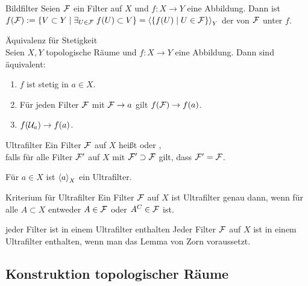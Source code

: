 \begin{Def}{Bildfilter}
    Seien $\mathcal{F}$ ein Filter auf $X$ und $f\colon X \rightarrow Y$ eine
    Abbildung.
    Dann ist \\
    $f(\mathcal{F}) := \{V \subset Y \;|\;
    \exists_{U \in \mathcal{F}}\; f(U) \subset V\} =
    \left\langle{\{f(U) \;|\; U \in \ensuremath{\mathcal{F}}\}}\right\rangle_Y$
    der  von $\mathcal{F}$ unter $f$.
\end{Def}

\begin{Satz}{Äquivalenz für Stetigkeit}\\
    Seien $X, Y$ topologische Räume und $f\colon X \rightarrow Y$ eine
    Abbildung.
    Dann sind äquivalent:
    \begin{enumerate}
        \item
        $f$ ist stetig in $a \in X$.

        \item
        Für jeden Filter $\mathcal{F}$ mit $\mathcal{F} \to a$ gilt $f(\mathcal{F}) \to f(a)$.

        \item
        $f(\mathcal{U}_a) \to f(a)$.
    \end{enumerate}
\end{Satz}

\linie

\begin{Def}{Ultrafilter}
    Ein Filter $\mathcal{F}$ auf $X$ heißt  oder
    , \\
    falls für alle Filter $\mathcal{F}'$ auf $X$ mit $\mathcal{F}' \supset \mathcal{F}$ gilt,
    dass $\mathcal{F}' = \mathcal{F}$.
\end{Def}

\begin{Bsp}
    Für $a \in X$ ist $\left\langle{a}\right\rangle_X$ ein Ultrafilter.
\end{Bsp}

\begin{Satz}{Kriterium für Ultrafilter}
    Ein Filter $\mathcal{F}$ auf $X$ ist Ultrafilter genau dann, wenn für alle
    $A \subset X$ entweder $A \in \mathcal{F}$ oder $A^C \in \mathcal{F}$ ist.
\end{Satz}

\begin{Satz}{jeder Filter ist in einem Ultrafilter enthalten}
    Jeder Filter $\mathcal{F}$ auf $X$ ist in einem Ultrafilter enthalten,
    wenn man das Lemma von Zorn voraussetzt.
\end{Satz}

\pagebreak

\subsection{%
    Konstruktion topologischer Räume%
}

